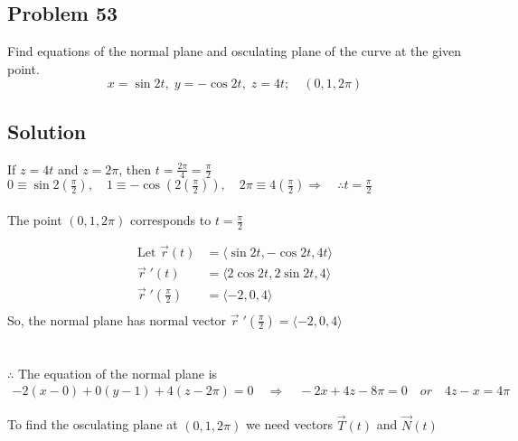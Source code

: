 \documentclass{article}
\newcommand\vv[1]{\langle #1 \rangle}
\newcommand\vc[2]{\vec{#1}(#2)}
\newcommand\vcd[2]{\vec{#1}\;'(#2)}
\newcommand\rr{\quad\Rightarrow\quad}
\begin{document}
\subsection*{Problem 53}

Find equations of the normal plane and osculating plane of the curve at the given point.
\[
    x = \sin{2t},\; y = -\cos{2t},\; z = 4t; \quad (0, 1, 2\pi)
\]

\subsection*{Solution}
If $z = 4t$ and $z = 2\pi$, then $t = \frac{2\pi}{4} = \frac \pi 2$ \\
$0 \equiv \sin{2(\frac \pi 2)}, \quad 1 \equiv -\cos(2(\frac \pi 2)), \quad 2\pi \equiv 4(\frac \pi 2) \Rightarrow \quad \therefore t = \frac \pi 2$ \\
\\
The point $(0, 1, 2\pi)$ corresponds to $t=\frac \pi 2$

\begin{align*}
\text{Let }\vc r t &= \vv{\sin 2t, -\cos 2t, 4t} \\
    \vcd r t &= \vv{2\cos 2t, 2\sin 2t, 4} \\
    \vcd {r}{\frac \pi 2} &= \vv{-2, 0, 4} \\
\end{align*}
So, the normal plane has normal vector $\vcd {r}{\frac \pi 2} = \vv{-2, 0, 4}$ \\ \\
\\

$\therefore$ The equation of the normal plane is
\begin{align*}
    -2(x-0)+0(y-1)+4(z-2\pi) = 0 \rr -2x + 4z - 8\pi = 0 \quad or \quad 4z - x = 4\pi
\end{align*}

To find the osculating plane at $(0, 1, 2\pi)$ we need vectors $\vc T t$ and $\vc N t$
\end{document}
